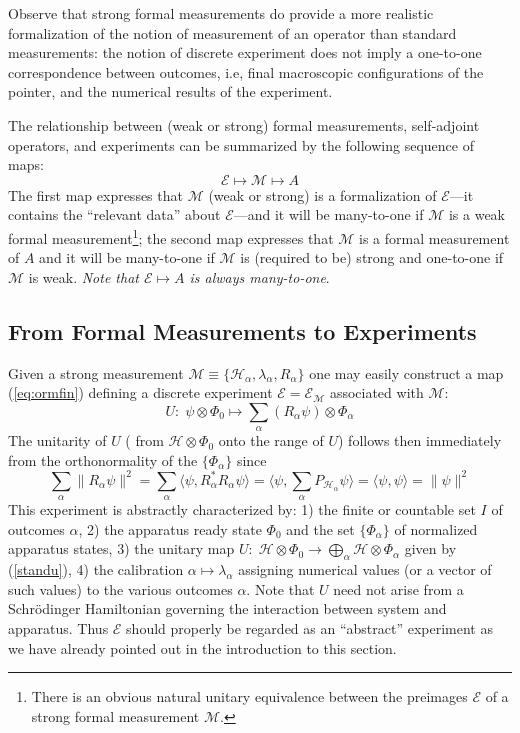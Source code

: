 \documentclass[12pt]{article}
\newcommand{\eq}[1]{(\ref{#1})}
\newcommand{\Sc}{Schr\"{o}dinger}
\newcommand{\sa}{self-adjoint}
\renewcommand{\a}{\alpha}
\newcommand{\la}{\lambda_{\a}}
\newcommand{\ot}{\otimes}
\newcommand{\biga}{\bigoplus_{\a}}
\newcommand{\Phia}{\Phi_{\a}}
\newcommand{\Ha}{{\H}_{\a}}
\renewcommand{\H}{\mbox{$\mathcal{H}$}}
\newcommand{\Pa}{ P_{ {\mathcal{H}_{\a} } } }
\newcommand{\Aa}{R_{\a}}
\newcommand{\E}{\mbox{$\mathscr{E}$}}
\newcommand{\M}{\mbox{$\mathcal{M}$}}
\begin{document}
Observe that strong formal measurements do provide a more realistic
formalization of the notion of measurement of an operator than
standard measurements: the notion of discrete experiment does not
imply a one-to-one correspondence between outcomes, i.e, final
macroscopic configurations of the pointer, and the numerical results
of the experiment.



The relationship between (weak or strong) formal measurements, \sa{}
operators, and experiments can be summarized by the following sequence
of maps:
\begin{equation}
\E \mapsto \M \mapsto A
\label{eq:etomtoa}
\end{equation}
The first map expresses that $\M$ (weak or strong) is a formalization
of \E{}---it contains the ``relevant data'' about \E{}---and it will
be many-to-one if \M{} is a weak formal measurement\footnote{There is
   an obvious natural unitary equivalence between the preimages \E{} of
   a strong formal measurement \M{}.}; the second map expresses that
\M{} is a formal measurement of $A$ and it will be many-to-one if \M{}
is (required to be) strong and one-to-one if \M{} is weak.  \emph{Note
   that $\E\mapsto A$ is always many-to-one}.

\subsection{From Formal Measurements to Experiments}\label{subsec.exp}

Given a strong measurement $\M\equiv \{\Ha, \la, \Aa \}$ one may
easily construct a map \eq{eq:ormfin} defining a discrete experiment
$\E{}=\E_{\mathcal{M}}$ associated with $\M$:
\begin{equation}
U: \;\psi \ot \Phi_0  \mapsto
\sum_{\a} (\Aa\psi) \ot \Phia
\label{standu}
\end{equation}
The unitarity of $U$ ( {}from $ \H\ot\Phi_0 $ onto the range of $U$)
follows then immediately {}from the orthonormality of the $\{\Phia\}$
since
\begin{equation}
\sum_{\a} \|\Aa\psi\|^{2} = \sum_{\a} \langle \psi, \Aa^{\ast}\Aa
\psi \rangle
= \langle \psi, \sum_{\a} \Pa \psi \rangle = \langle
\psi,\psi\rangle = \|\psi\|^2
\label{eq:unide}
\end{equation}
This experiment is abstractly characterized by: 1) the finite or
countable set $I$ of outcomes $\a$, 2) the apparatus ready state
$\Phi_{0}$ and the set $\{\Phia\}$ of normalized apparatus states, 3)
the unitary map $U : \;{\H}\ot\Phi_0 \to \biga {\H} \ot\Phia$ given by
(\ref{standu}), 4) the calibration $\a \mapsto \la$ assigning
numerical values (or a vector of such values) to the various outcomes
$\a$.  Note that $U$ need not arise {}from a \Sc{} Hamiltonian
governing the interaction between system and apparatus. Thus \E{}
should properly be regarded as an ``abstract'' experiment as we have
already pointed out in the introduction to this section.
\end{document}
